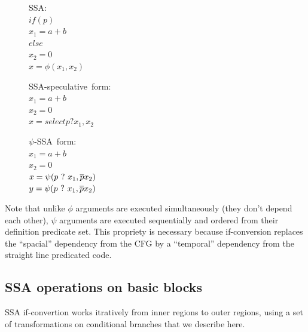\begin{figure}
\begin{minipage}[t]{4cm}
\mbox{SSA:} \\
$ if (p) $ \\
$   x_1 = a+b $ \\
$ else $ \\
$   x_2 = 0 $ \\
$ x = \phi (x_1, x_2) $ \\
\end{minipage}
\begin{minipage}[t]{4cm}
\mbox{SSA-speculative form:} \\
$x_1 = a + b $ \\
$x_2 = 0 $ \\
$x = select p ? x_1, x_2$ \\
\end{minipage}
\begin{minipage}[t]{4cm}
\mbox{$\psi$-SSA form:} \\
$x_1 = a + b $ \\
$x_2 = 0 $\\
$x = \psi (p ~?~ x_1, \overline{p} x_2) $ \\
$y = \psi (p ~?~ x_1, \overline{p} x_2) $ \\
\end{minipage}
\end{figure}

Note that unlike $\phi$ arguments are executed simultaneously (they don't depend each other), $\psi$ arguments are executed sequentially and ordered from their definition predicate set. This propriety is necessary because if-conversion replaces the ``spacial'' dependency from the CFG by a ``temporal'' dependency from the straight line predicated code.

\subsection{SSA operations on basic blocks}

SSA if-convertion works itratively from inner regions to outer regions, using a set of transformations on conditional branches that we describe here.

